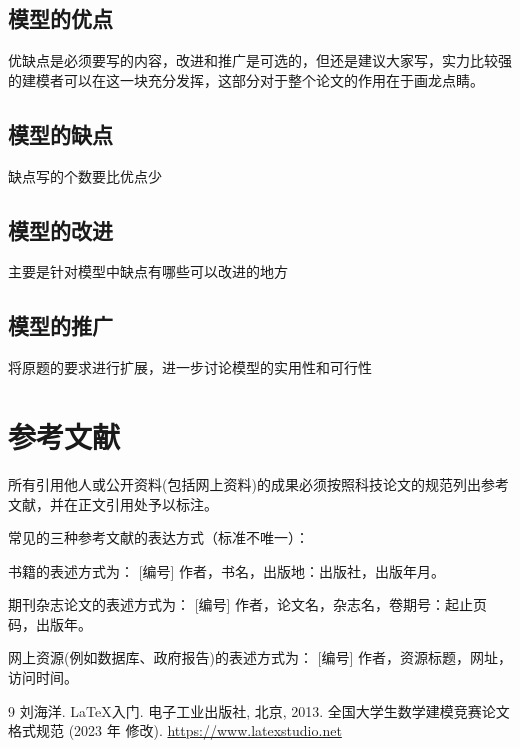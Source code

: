 \documentclass[withoutpreface,bwprint]{cumcmthesis} %
\begin{document}
\subsection{模型的优点}

优缺点是必须要写的内容，改进和推广是可选的，但还是建议大家写，实力比较强的建模者可以在这一块充分发挥，这部分对于整个论文的作用在于画龙点睛。

\subsection{模型的缺点}

缺点写的个数要比优点少

\subsection{模型的改进}

主要是针对模型中缺点有哪些可以改进的地方

\subsection{模型的推广}

将原题的要求进行扩展，进一步讨论模型的实用性和可行性

\section{参考文献}

所有引用他人或公开资料(包括网上资料)的成果必须按照科技论文的规范列出参考文献，并在正文引用处予以标注。

常见的三种参考文献的表达方式（标准不唯一）：

书籍的表述方式为： [编号] 作者，书名，出版地：出版社，出版年月。

期刊杂志论文的表述方式为： [编号] 作者，论文名，杂志名，卷期号：起止页码，出版年。

网上资源(例如数据库、政府报告)的表述方式为： [编号] 作者，资源标题，网址，访问时间。

\begin{thebibliography}{9}%
    刘海洋.
    \newblock \LaTeX {}入门\allowbreak[J].
    \newblock 电子工业出版社, 北京, 2013.
    全国大学生数学建模竞赛论文格式规范 (2023 年 修改).
     \url{https://www.latexstudio.net}
\end{thebibliography}
\end{document}
